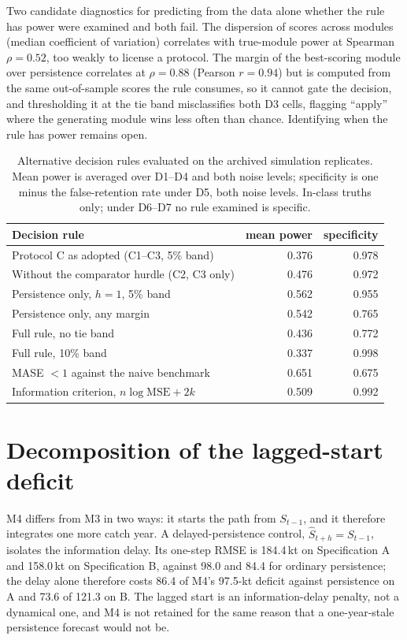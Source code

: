 \documentclass[preprint,11pt,authoryear]{elsarticle}
\theoremstyle{remark}
\begin{document}
Two candidate diagnostics for predicting from the data alone whether the rule has power were examined and both fail. The dispersion of scores across modules (median coefficient of variation) correlates with true-module power at Spearman $\rho = 0.52$, too weakly to license a protocol. The margin of the best-scoring module over persistence correlates at $\rho = 0.88$ (Pearson $r = 0.94$) but is computed from the same out-of-sample scores the rule consumes, so it cannot gate the decision, and thresholding it at the tie band misclassifies both D3 cells, flagging ``apply'' where the generating module wins less often than chance. Identifying when the rule has power remains open.

\FloatBarrier

\begin{table}[!htb]
\centering\footnotesize\setlength{\tabcolsep}{3.5pt}
\caption{Alternative decision rules evaluated on the archived simulation replicates. Mean power is averaged over D1--D4 and both noise levels; specificity is one minus the false-retention rate under D5, both noise levels. In-class truths only; under D6--D7 no rule examined is specific.}
\label{tab:si_rules}
\begin{tabular}{@{}lrr@{}}
\toprule
Decision rule & mean power & specificity \\
\midrule
Protocol C as adopted (C1--C3, 5\% band) & 0.376 & 0.978 \\
Without the comparator hurdle (C2, C3 only) & 0.476 & 0.972 \\
Persistence only, $h=1$, 5\% band & 0.562 & 0.955 \\
Persistence only, any margin & 0.542 & 0.765 \\
Full rule, no tie band & 0.436 & 0.772 \\
Full rule, 10\% band & 0.337 & 0.998 \\
MASE $<1$ against the naive benchmark & 0.651 & 0.675 \\
Information criterion, $n\log\mathrm{MSE} + 2k$ & 0.509 & 0.992 \\
\bottomrule
\end{tabular}
\end{table}

\section{Decomposition of the lagged-start deficit}\label{si:m4}

M4 differs from M3 in two ways: it starts the path from $S_{t-1}$, and it therefore integrates one more catch year. A delayed-persistence control, $\hat S_{t+h} = S_{t-1}$, isolates the information delay. Its one-step RMSE is 184.4\,kt on Specification A and 158.0\,kt on Specification B, against 98.0 and 84.4 for ordinary persistence; the delay alone therefore costs 86.4 of M4's 97.5-kt deficit against persistence on A and 73.6 of 121.3 on B. The lagged start is an information-delay penalty, not a dynamical one, and M4 is not retained for the same reason that a one-year-stale persistence forecast would not be.
\end{document}
